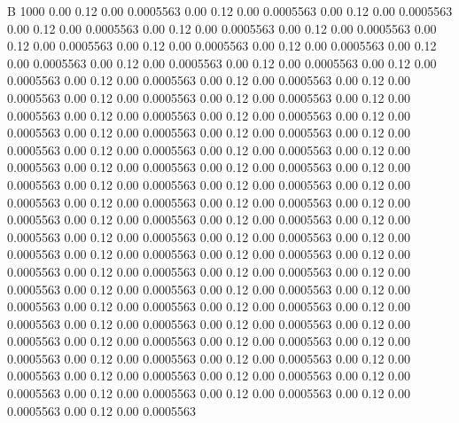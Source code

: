


B 1000
   0.00    0.12    0.00   0.0005563
   0.00    0.12    0.00   0.0005563
   0.00    0.12    0.00   0.0005563
   0.00    0.12    0.00   0.0005563
   0.00    0.12    0.00   0.0005563
   0.00    0.12    0.00   0.0005563
   0.00    0.12    0.00   0.0005563
   0.00    0.12    0.00   0.0005563
   0.00    0.12    0.00   0.0005563
   0.00    0.12    0.00   0.0005563
   0.00    0.12    0.00   0.0005563
   0.00    0.12    0.00   0.0005563
   0.00    0.12    0.00   0.0005563
   0.00    0.12    0.00   0.0005563
   0.00    0.12    0.00   0.0005563
   0.00    0.12    0.00   0.0005563
   0.00    0.12    0.00   0.0005563
   0.00    0.12    0.00   0.0005563
   0.00    0.12    0.00   0.0005563
   0.00    0.12    0.00   0.0005563
   0.00    0.12    0.00   0.0005563
   0.00    0.12    0.00   0.0005563
   0.00    0.12    0.00   0.0005563
   0.00    0.12    0.00   0.0005563
   0.00    0.12    0.00   0.0005563
   0.00    0.12    0.00   0.0005563
   0.00    0.12    0.00   0.0005563
   0.00    0.12    0.00   0.0005563
   0.00    0.12    0.00   0.0005563
   0.00    0.12    0.00   0.0005563
   0.00    0.12    0.00   0.0005563
   0.00    0.12    0.00   0.0005563
   0.00    0.12    0.00   0.0005563
   0.00    0.12    0.00   0.0005563
   0.00    0.12    0.00   0.0005563
   0.00    0.12    0.00   0.0005563
   0.00    0.12    0.00   0.0005563
   0.00    0.12    0.00   0.0005563
   0.00    0.12    0.00   0.0005563
   0.00    0.12    0.00   0.0005563
   0.00    0.12    0.00   0.0005563
   0.00    0.12    0.00   0.0005563
   0.00    0.12    0.00   0.0005563
   0.00    0.12    0.00   0.0005563
   0.00    0.12    0.00   0.0005563
   0.00    0.12    0.00   0.0005563
   0.00    0.12    0.00   0.0005563
   0.00    0.12    0.00   0.0005563
   0.00    0.12    0.00   0.0005563
   0.00    0.12    0.00   0.0005563
   0.00    0.12    0.00   0.0005563
   0.00    0.12    0.00   0.0005563
   0.00    0.12    0.00   0.0005563
   0.00    0.12    0.00   0.0005563
   0.00    0.12    0.00   0.0005563
   0.00    0.12    0.00   0.0005563
   0.00    0.12    0.00   0.0005563
   0.00    0.12    0.00   0.0005563
   0.00    0.12    0.00   0.0005563
   0.00    0.12    0.00   0.0005563
   0.00    0.12    0.00   0.0005563
   0.00    0.12    0.00   0.0005563
   0.00    0.12    0.00   0.0005563
   0.00    0.12    0.00   0.0005563
   0.00    0.12    0.00   0.0005563
   0.00    0.12    0.00   0.0005563
   0.00    0.12    0.00   0.0005563
   0.00    0.12    0.00   0.0005563
   0.00    0.12    0.00   0.0005563
   0.00    0.12    0.00   0.0005563
   0.00    0.12    0.00   0.0005563
